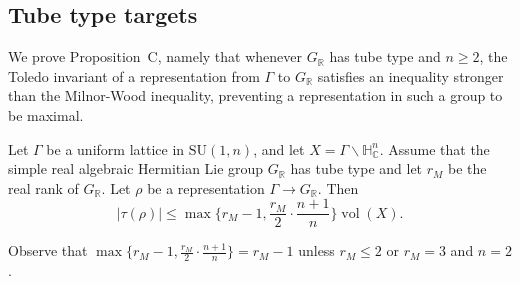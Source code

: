 \subsection{Tube type targets}
We prove Proposition~C, namely that whenever $G_{\mathbb R}$ has tube type and $n\geqslant2$, the Toledo invariant of a representation from $\Gamma$ to $G_{\mathbb R}$ satisfies an inequality stronger than the Milnor-Wood inequality, preventing a representation in such a group to be maximal.
\begin{proposition}
Let $\Gamma$ be a uniform lattice in $\mathrm{SU}(1,n)$, and let $X=\Gamma\backslash\mathbb H^n_{\mathbb C}$. Assume that the simple real algebraic Hermitian Lie group $G_{\mathbb R}$ has tube type and let $r_M$ be the real rank of $G_{\mathbb R}$. Let $\rho$ be a representation $\Gamma\to G_{\mathbb R}$. Then
\[
|\tau(\rho)|\leqslant\max\Big\{r_M-1,\frac{r_M}{2}\cdot\frac{n+1}{n}\Big\}\operatorname{vol}(X).
\]
\end{proposition}
\begin{remark}
Observe that $\max\big\{r_M-1,\frac{r_M}{2}\cdot\frac{n+1}{n}\big\}=r_M-1$ unless $r_M\leqslant2$ or $r_M=3$ and $n=2$.
\end{remark}
